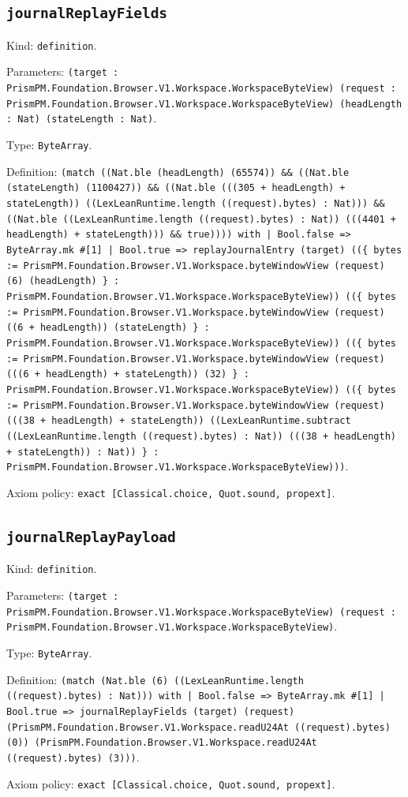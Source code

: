 \documentclass[11pt]{article}
\begin{document}
\subsection*{\texttt{journalReplayFields}}
\noindent Kind: \texttt{definition}.\par
\noindent Parameters: \texttt{(target : PrismPM.Foundation.Browser.V1.Workspace.WorkspaceByteView) (request : PrismPM.Foundation.Browser.V1.Workspace.WorkspaceByteView) (headLength : Nat) (stateLength : Nat)}.\par
\noindent Type: \texttt{ByteArray}.\par
\noindent Definition: \texttt{(match ((Nat.ble (headLength) (65574)) \&\& ((Nat.ble (stateLength) (1100427)) \&\& ((Nat.ble (((305 + headLength) + stateLength)) ((LexLeanRuntime.length ((request).bytes) : Nat))) \&\& ((Nat.ble ((LexLeanRuntime.length ((request).bytes) : Nat)) (((4401 + headLength) + stateLength))) \&\& true)))) with | Bool.false => ByteArray.mk \#[1] | Bool.true => replayJournalEntry (target) ((\{ bytes := PrismPM.Foundation.Browser.V1.Workspace.byteWindowView (request) (6) (headLength) \} : PrismPM.Foundation.Browser.V1.Workspace.WorkspaceByteView)) ((\{ bytes := PrismPM.Foundation.Browser.V1.Workspace.byteWindowView (request) ((6 + headLength)) (stateLength) \} : PrismPM.Foundation.Browser.V1.Workspace.WorkspaceByteView)) ((\{ bytes := PrismPM.Foundation.Browser.V1.Workspace.byteWindowView (request) (((6 + headLength) + stateLength)) (32) \} : PrismPM.Foundation.Browser.V1.Workspace.WorkspaceByteView)) ((\{ bytes := PrismPM.Foundation.Browser.V1.Workspace.byteWindowView (request) (((38 + headLength) + stateLength)) ((LexLeanRuntime.subtract ((LexLeanRuntime.length ((request).bytes) : Nat)) (((38 + headLength) + stateLength)) : Nat)) \} : PrismPM.Foundation.Browser.V1.Workspace.WorkspaceByteView)))}.\par
\noindent Axiom policy: \texttt{exact [Classical.choice, Quot.sound, propext]}.\par
\subsection*{\texttt{journalReplayPayload}}
\noindent Kind: \texttt{definition}.\par
\noindent Parameters: \texttt{(target : PrismPM.Foundation.Browser.V1.Workspace.WorkspaceByteView) (request : PrismPM.Foundation.Browser.V1.Workspace.WorkspaceByteView)}.\par
\noindent Type: \texttt{ByteArray}.\par
\noindent Definition: \texttt{(match (Nat.ble (6) ((LexLeanRuntime.length ((request).bytes) : Nat))) with | Bool.false => ByteArray.mk \#[1] | Bool.true => journalReplayFields (target) (request) (PrismPM.Foundation.Browser.V1.Workspace.readU24At ((request).bytes) (0)) (PrismPM.Foundation.Browser.V1.Workspace.readU24At ((request).bytes) (3)))}.\par
\noindent Axiom policy: \texttt{exact [Classical.choice, Quot.sound, propext]}.\par
\end{document}

